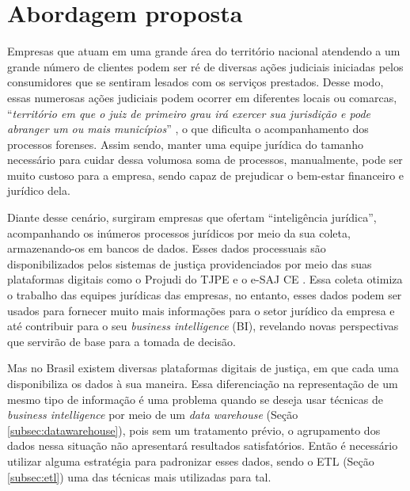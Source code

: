 \section{Abordagem proposta}
\label{sec:abordagem}

Empresas que atuam em uma grande área do território nacional atendendo a um grande número de clientes podem ser ré de diversas ações judiciais iniciadas pelos consumidores que se sentiram lesados com os serviços prestados. Desse modo, essas numerosas ações judiciais podem ocorrer em diferentes locais ou comarcas, \enquote{\textit{território em que o juiz de primeiro grau irá exercer sua jurisdição e pode abranger um ou mais municípios}} \cite{cnj:comarca}, o que dificulta o acompanhamento dos processos forenses. Assim sendo, manter uma equipe jurídica do tamanho necessário para cuidar dessa volumosa soma de processos, manualmente, pode ser muito custoso para a empresa, sendo capaz de prejudicar o bem-estar financeiro e jurídico dela.

Diante desse cenário, surgiram empresas que ofertam \enquote{inteligência jurídica}, acompanhando os inúmeros processos jurídicos por meio da sua coleta, armazenando-os em bancos de dados. Esses dados processuais são disponibilizados pelos sistemas de justiça providenciados por meio das suas plataformas digitais como o Projudi do TJPE \cite{tjpe} e o e-SAJ CE \cite{esajce}. Essa coleta otimiza o trabalho das equipes jurídicas das empresas, no entanto, esses dados podem ser usados para fornecer muito mais informações para o setor jurídico da empresa e até contribuir para o seu \textit{business intelligence} (BI), revelando novas perspectivas que servirão de base para a tomada de decisão.

Mas no Brasil existem diversas plataformas digitais de justiça, em que cada uma disponibiliza os dados à sua maneira. Essa diferenciação na representação de um mesmo tipo de informação é uma problema quando se deseja usar técnicas de \textit{business intelligence} por meio de um \textit{data warehouse} (Seção \ref{subsec:datawarehouse}), pois sem um tratamento prévio, o agrupamento dos dados nessa situação não apresentará resultados satisfatórios. Então é necessário utilizar alguma estratégia para padronizar esses dados, sendo o ETL (Seção \ref{subsec:etl}) uma das técnicas mais utilizadas para tal.

